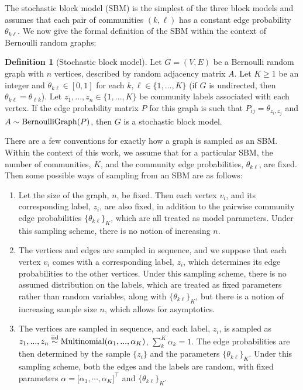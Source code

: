 \documentclass[
  12pt,
]{article}
\providecommand{\tightlist}{%
  \setlength{\itemsep}{0pt}\setlength{\parskip}{0pt}}
\theoremstyle{definition}
\newtheorem{definition}{Definition}[section]
\theoremstyle{definition}
\theoremstyle{definition}
\theoremstyle{definition}
\theoremstyle{remark}
\begin{document}
The stochastic block model (SBM) \citep{doi:10.1080/0022250X.1971.9989788} is the simplest of the three block models and assumes that each pair of communities \((k, \ell)\) has a constant edge probability \(\theta_{k \ell}\).
We now give the formal definition of the SBM within the context of Bernoulli random graphs:

\begin{definition}[Stochastic block model]
\label{def:sbm}
Let $G = (V, E)$ be a Bernoulli random graph with $n$ vertices, described by random adjacency matrix $A$. 
Let $K \geq 1$ be an integer and $\theta_{k \ell} \in [0, 1]$ for each $k, \ell \in \{1, ..., K\}$ (if $G$ is undirected, then $\theta_{k \ell} = \theta_{\ell k}$). 
Let $z_1, ..., z_n \in \{1, ..., K\}$ be community labels associated with each vertex. 
If the edge probability matrix $P$ for this graph is such that 
$P_{ij} = \theta_{z_i, z_j}$ and $A \sim \mathrm{BernoulliGraph}(P)$, then $G$ is a stochastic block model. 
\end{definition}

There are a few conventions for exactly how a graph is sampled as an SBM.
Within the context of this work, we assume that for a particular SBM, the number of communities, \(K\), and the community edge probabilities, \(\theta_{k \ell}\), are fixed.
Then some possible ways of sampling from an SBM are as follows:

\begin{enumerate}
\def\labelenumi{\arabic{enumi}.}
\tightlist
\item
  Let the size of the graph, \(n\), be fixed.
  Then each vertex \(v_i\), and its corresponding label, \(z_i\), are also fixed, in addition to the pairwise community edge probabilities \(\{\theta_{k \ell}\}_K\), which are all treated as model parameters.
  Under this sampling scheme, there is no notion of increasing \(n\).
\item
  The vertices and edges are sampled in sequence, and we suppose that each vertex \(v_i\) comes with a corresponding label, \(z_i\), which determines its edge probabilities to the other vertices.
  Under this sampling scheme, there is no assumed distribution on the labels, which are treated as fixed parameters rather than random variables, along with \(\{\theta_{k \ell}\}_K\), but there is a notion of increasing sample size \(n\), which allows for asymptotics.
\item
  The vertices are sampled in sequence, and each label, \(z_i\), is sampled as \(z_1, ..., z_n \stackrel{\mathrm{iid}}{\sim} \mathrm{Multinomial}(\alpha_1, ..., \alpha_K)\), \(\sum_k^K \alpha_k = 1\).
  The edge probabilities are then determined by the sample \(\{z_i\}\) and the parameters \(\{\theta_{k \ell}\}_K\).
  Under this sampling scheme, both the edges and the labels are random, with fixed parameters \(\alpha = \Big[ \alpha_1, \cdots, \alpha_K \Big]^\top\) and \(\{\theta_{k \ell}\}_K\).
\end{enumerate}
\end{document}
